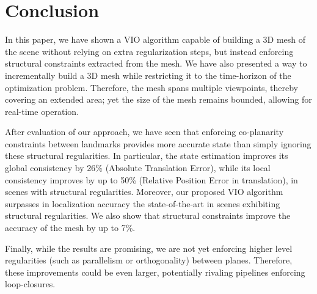 
\section{Conclusion}
\label{sec:conclusions}

In this paper, we have shown a VIO algorithm capable of building a 3D mesh of the scene without relying on extra regularization steps, but instead enforcing structural constraints extracted from the mesh.
We have also presented a way to incrementally build a 3D mesh while restricting it to the time-horizon of the optimization problem.
Therefore, the mesh spans multiple viewpoints, thereby covering an extended area; yet the size of the mesh remains bounded, allowing for real-time operation.

After evaluation of our approach, we have seen that enforcing co-planarity constraints between landmarks provides more accurate state  than simply ignoring these structural regularities.
In particular, the state estimation improves its global consistency by 26\% (Absolute Translation Error), while its local consistency improves by up to 50\% (Relative Position Error in translation), in scenes with structural regularities.
 Moreover, our proposed VIO algorithm surpasses in localization accuracy the state-of-the-art in scenes exhibiting structural regularities.
We also show that structural constraints improve the accuracy of the mesh by up to 7\%.

Finally, while the results are promising, we are not yet enforcing higher level regularities (such as parallelism or orthogonality) between planes.
Therefore, these improvements could be even larger, potentially rivaling pipelines enforcing loop-closures.


